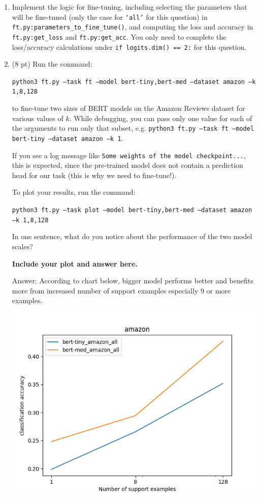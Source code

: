 \documentclass[12pt]{article}
\begin{document}
\begin{enumerate}
    \item Implement the logic for fine-tuning, including selecting the parameters that will be fine-tuned (only the case for \texttt{`all'} for this question) in \texttt{ft.py:\allowbreak parameters\_to\allowbreak \_fine\_tune()}, and computing the loss and accuracy in \texttt{ft.py:\allowbreak get\_loss} and \texttt{ft.py:\allowbreak get\_acc}. You only need to complete the loss/accuracy calculations under \texttt{if logits.dim() == 2:} for this question.
    \item (8 pt) Run the command:
    
    {\small\texttt{python3 ft.py --task ft --model bert-tiny,bert-med --dataset amazon --k 1,8,128}}
    
    to fine-tune two sizes of BERT models on the Amazon Reviews dataset for various values of $k$. While debugging, you can pass only one value for each of the arguments to run only that subset, e.g. \texttt{python3 ft.py --task ft --model bert-tiny --dataset amazon --k 1}.
    
    If you see a log message like \texttt{Some weights of the model checkpoint...}, this is expected, since the pre-trained model does not contain a prediction head for our task (this is why we need to fine-tune!).

    To plot your results, run the command:
    
    {\small\texttt{python3 ft.py --task plot --model bert-tiny,bert-med --dataset amazon --k 1,8,128}}
    
    In one sentence, what do you notice about the performance of the two model scales?
    
    \textbf{\color{red}Include your plot and answer here.}

    Answer: According to chart below, bigger model performs better and benefits more from increased number of support examples especially 9 or more examples.

    \includegraphics{images/q0}


\end{enumerate}
\end{document}
